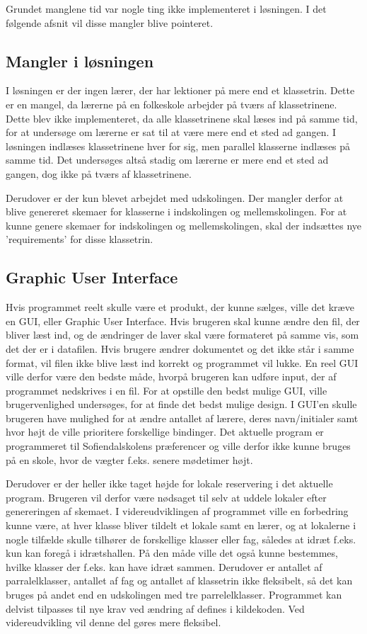 Grundet manglene tid var nogle ting ikke implementeret i løsningen. I det følgende afsnit vil disse mangler blive pointeret. 

\subsection{Mangler i løsningen}
I løsningen er der ingen lærer, der har lektioner på mere end et klassetrin. Dette er en mangel, da lærerne på en folkeskole arbejder på tværs af klassetrinene. Dette blev ikke implementeret, da alle klassetrinene skal læses ind på samme tid, for at undersøge om lærerne er sat til at være mere end et sted ad gangen. I løsningen indlæses klassetrinene hver for sig, men parallel klasserne indlæses på samme tid. Det undersøges altså stadig om lærerne er mere end et sted ad gangen, dog ikke på tværs af klassetrinene. 

Derudover er der kun blevet arbejdet med udskolingen. Der mangler derfor at blive genereret skemaer for klasserne i indskolingen og mellemskolingen. For at kunne genere skemaer for indskolingen og mellemskolingen, skal der indsættes nye ’requirements’ for disse klassetrin.

\subsection{Graphic User Interface}
Hvis programmet reelt skulle være et produkt, der kunne sælges, ville det kræve en GUI, eller Graphic User Interface. Hvis brugeren skal kunne ændre den fil, der bliver læst ind, og de ændringer de laver skal være formateret på samme vis, som det der er i datafilen. Hvis brugere ændrer dokumentet og det ikke står i samme format, vil filen ikke blive læst ind korrekt og programmet vil lukke. En reel GUI ville derfor være den bedste måde, hvorpå brugeren kan udføre input, der af programmet nedskrives i en fil. For at opstille den bedst mulige GUI, ville brugervenlighed undersøges, for at finde det bedst mulige design. I GUI’en skulle brugeren have mulighed for at ændre antallet af lærere, deres navn/initialer samt hvor højt de ville prioritere forskellige bindinger. 
Det aktuelle program er programmeret til Sofiendalskolens præferencer og ville derfor ikke kunne bruges på en skole, hvor de vægter f.eks. senere mødetimer højt. 

Derudover er der heller ikke taget højde for lokale reservering i det aktuelle program. Brugeren vil derfor være nødsaget til selv at uddele lokaler efter genereringen af skemaet. I videreudviklingen af programmet ville en forbedring kunne være, at hver klasse bliver tildelt et lokale samt en lærer, og at lokalerne i nogle tilfælde skulle tilhører de forskellige klasser eller fag, således at idræt f.eks. kun kan foregå i idrætshallen. På den måde ville det også kunne bestemmes, hvilke klasser der f.eks. kan have idræt sammen. Derudover er antallet af parralelklasser, antallet af fag og antallet af klassetrin ikke fleksibelt, så det kan bruges på andet end en udskolingen med tre parrelelklasser. Programmet kan delvist tilpasses til nye krav ved ændring af defines i kildekoden. Ved videreudvikling vil denne del gøres mere fleksibel.

